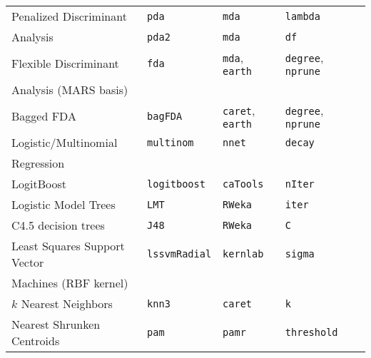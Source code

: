 \documentclass[12pt]{article}
\begin{document}
\begin{longtable}{lllll}
      Penalized Discriminant  &
         \texttt{pda} & 
            \texttt{mda}       & 
            \texttt{lambda} & \\
      
     \: \: Analysis &
         \texttt{pda2} & 
            \texttt{mda}       & 
            \texttt{df} & \\     
      
      Flexible Discriminant  &
         \texttt{fda} & 
            \texttt{mda}, \texttt{earth}       & 
            \texttt{degree}, \texttt{nprune} & \\
      \: \: Analysis (MARS basis)\\      
      
      Bagged FDA &
         \texttt{bagFDA} & 
            \texttt{caret},  \texttt{earth}       & 
            \texttt{degree}, \texttt{nprune} \\   
            
      Logistic/Multinomial  &
         \texttt{multinom} & 
            \texttt{nnet}       & 
            \texttt{decay}& \\   
      \: \: Regression \\ 
      
      LogitBoost &      
         \texttt{logitboost} & 
            \texttt{caTools}       &          
            \texttt{nIter}\\              
            
      Logistic Model Trees &
         \texttt{LMT} & 
            \texttt{RWeka}    & 
            \texttt{iter}  \\  
            
      C4.5 decision trees &
         \texttt{J48} & 
            \texttt{RWeka}    & 
            \texttt{C}  \\  
            
      Least Squares Support Vector  &
         \texttt{lssvmRadial} & 
            \texttt{kernlab}       & 
            \texttt{sigma} \\            
      \:\:  Machines (RBF kernel) & & &\\   
      
                
      $k$ Nearest Neighbors &
         \texttt{knn3} & 
            \texttt{caret}       & 
            \texttt{k} \\   
                  
      Nearest Shrunken Centroids &
         \texttt{pam} & 
            \texttt{pamr}       & 
            \texttt{threshold} \\  
                                                                   

\end{longtable}
\end{document}
